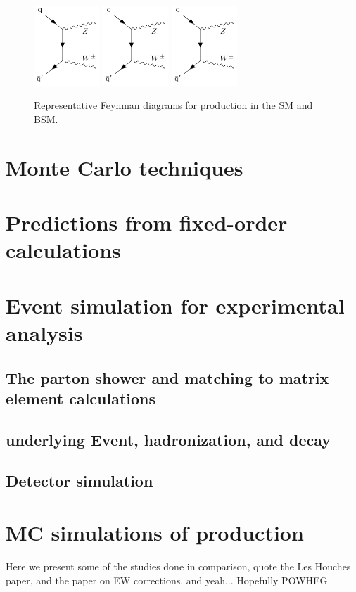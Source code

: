\begin{figure}[htbp]
  \centering
   \includegraphics[page=1,width=0.22\textwidth]{figures/FeynmanDiagrams/WZNLOfeynman.pdf}
   \includegraphics[page=2,width=0.22\textwidth]{figures/FeynmanDiagrams/WZNLOfeynman.pdf}
   \includegraphics[page=3,width=0.22\textwidth]{figures/FeynmanDiagrams/WZNLOfeynman.pdf}
  \caption{Representative Feynman diagrams for \WZjj production in the SM and BSM. 
  }
 \label{fig:WZNLO}
\end{figure}

\section{Monte Carlo techniques}
\section{Predictions from fixed-order calculations}
\section{Event simulation for experimental analysis}
  \subsection{The parton shower and matching to matrix element calculations}
  \subsection{underlying Event, hadronization, and decay}
  \subsection{Detector simulation}
\section{MC simulations of \WZjj production}

Here we present some of the studies done in comparison, quote the Les Houches paper,
and the paper on EW corrections, and yeah... Hopefully POWHEG
